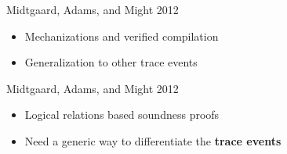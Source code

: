 \begin{frame}

  \Large
  Midtgaard, Adams, and Might 2012

  \vspace{1em}

  \begin{itemize}
  \item Mechanizations and verified compilation \pause
  \item Generalization to other trace events
  \end{itemize}

\end{frame}

\begin{frame}

  \Large
  Midtgaard, Adams, and Might 2012

  \vspace{1em}

  \begin{itemize}
  \item Logical relations based soundness proofs \pause
  \item Need a generic way to differentiate the \textbf{trace events}
  \end{itemize}

\end{frame}
